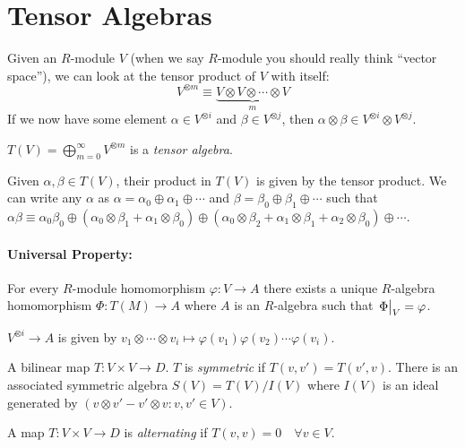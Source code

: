 \documentclass[a4paper,twoside,master.tex]{subfiles}
\begin{document}
\section{Tensor Algebras}\label{sec:tensor_algebras}

Given an $ R $-module $ V $ (when we say $ R $-module you should really think ``vector space''), we can look at the tensor product of $ V $ with itself:
\begin{equation}
    V^{\otimes m} \equiv \underbrace{V \otimes V \otimes \cdots \otimes V}_{m}
\end{equation}
If we now have some element $ \alpha \in V^{\otimes i} $ and $ \beta \in V^{\otimes j} $, then $ \alpha \otimes \beta \in V^{\otimes i} \otimes V^{\otimes j} $.

\begin{definition}
    $ T(V) = \bigoplus_{m=0}^{\infty} V^{\otimes m} $ is a \textit{tensor algebra}.

    Given $ \alpha, \beta \in T(V) $, their product in $ T(V) $ is given by the tensor product. We can write any $ \alpha $ as $ \alpha = \alpha_0 \oplus \alpha_1 \oplus \cdots $ and $ \beta = \beta_0 \oplus \beta_1 \oplus \cdots $ such that $ \alpha \beta \equiv \alpha_0 \beta_0 \oplus (\alpha_0 \otimes \beta_1 + \alpha_1 \otimes \beta_0) \oplus (\alpha_0 \otimes \beta_2 + \alpha_1 \otimes \beta_1 + \alpha_2 \otimes \beta_0) \oplus \cdots $.
\end{definition}

\paragraph{Universal Property:} For every $ R $-module homomorphism $ \varphi \colon V \to A $ there exists a unique $ R $-algebra homomorphism $ \Phi\colon T(M) \to A $ where $ A $ is an $ R $-algebra such that $ \eval{\Phi}_{V} = \varphi $.

$ V^{\otimes i} \to A $ is given by $ v_1 \otimes \cdots \otimes v_i \mapsto \varphi(v_1) \varphi(v_2) \cdots \varphi(v_i) $. 


\begin{definition}
    A bilinear map $ T\colon V \times V \to D $. $ T $ is \textit{symmetric} if $ T(v,v') = T(v',v) $. There is an associated symmetric algebra $ S(V) = T(V) / I(V) $ where $ I(V) $ is an ideal generated by $ (v \otimes v' - v' \otimes v\colon v,v' \in V) $.
\end{definition}

\begin{definition}
    A map $ T\colon V \times V \to D $ is \textit{alternating} if $ T(v,v) = 0 \quad\forall v \in V $.
\end{definition}
\end{document}
